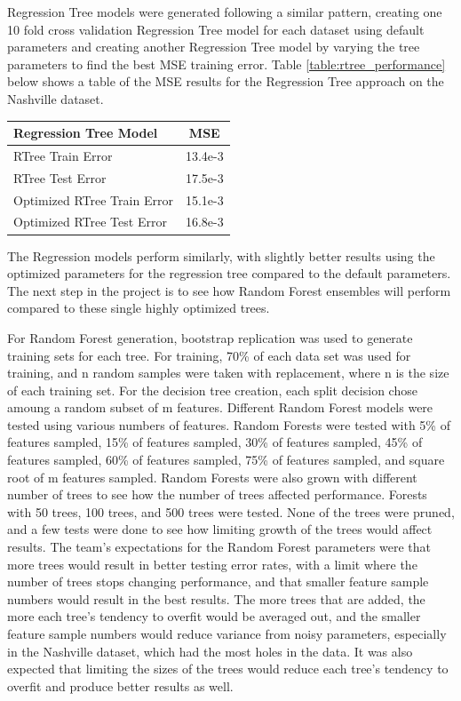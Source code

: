 \documentclass[10pt]{article}
\begin{document}
\begin{multicols}{2}
		Regression Tree models were generated following a similar pattern, creating one 10 fold cross validation Regression Tree model for each dataset using default parameters and creating another Regression Tree model by varying the tree parameters to find the best MSE training error. Table \ref{table:rtree_performance} below shows a table of the MSE results for the Regression Tree approach on the Nashville dataset. 

		\begin{center}
		\captionsetup{type=table}
			\begin{tabular}{l|c}
				Regression Tree Model & MSE \\
				\hline
				RTree Train Error & 13.4e-3 \\
				RTree Test Error & 17.5e-3 \\
				Optimized RTree Train Error & 15.1e-3 \\
				Optimized RTree Test Error & 16.8e-3 \\
			\end{tabular}
			\label{table:rtree_performance}        
		\end{center}
	
		The Regression models perform similarly, with slightly better results using the optimized parameters for the regression tree compared to the default parameters. The next step in the project is to see how Random Forest ensembles will perform compared to these single highly optimized trees.

		For Random Forest generation, bootstrap replication was used to generate training sets for each tree. For training, 70\% of each data set was used for training, and n random samples were taken with replacement, where n is the size of each training set. For the decision tree creation, each split decision chose amoung a random subset of m features. Different Random Forest models were tested using various numbers of features. Random Forests were tested with 5\% of features sampled, 15\% of features sampled, 30\% of features sampled, 45\% of features sampled, 60\% of features sampled, 75\% of features sampled, and square root of m features sampled. Random Forests were also grown with different number of trees to see how the number of trees affected performance. Forests with 50 trees, 100 trees, and 500 trees were tested. None of the trees were pruned, and a few tests were done to see how limiting growth of the trees would affect results. 
		The team's expectations for the Random Forest parameters were that more trees would result in better testing error rates, with a limit where the number of trees stops changing performance, and that smaller feature sample numbers would result in the best results. The more trees that are added, the more each tree's tendency to overfit would be averaged out, and the smaller feature sample numbers would reduce variance from noisy parameters, especially in the Nashville dataset, which had the most holes in the data. It was also expected that limiting the sizes of the trees would reduce each tree's tendency to overfit and produce better results as well. 


\end{multicols}
\end{document}
